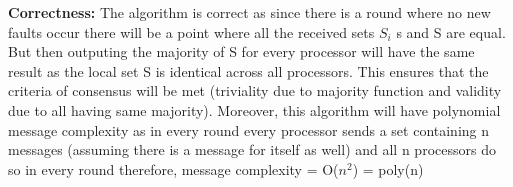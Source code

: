 \documentclass[11pt]{article}
\newcommand\correctness{\vspace{.10in}\textbf{Correctness: }\newline}
\begin{document}
\correctness
The algorithm is correct as since there is a round where no new faults occur there will be a point where all the received sets $S_i$ s and S are equal. But then outputing the majority of S for every processor will have the same result as the local set S is identical across all processors. This ensures that the criteria of consensus will be met (triviality due to majority function and validity due to all having same majority). Moreover, this algorithm will have polynomial message complexity as in every round every processor sends a set containing n messages (assuming there is a message for itself as well) and all n processors do so in every round therefore, message complexity = O($n^2$) = poly(n)
\end{document}
